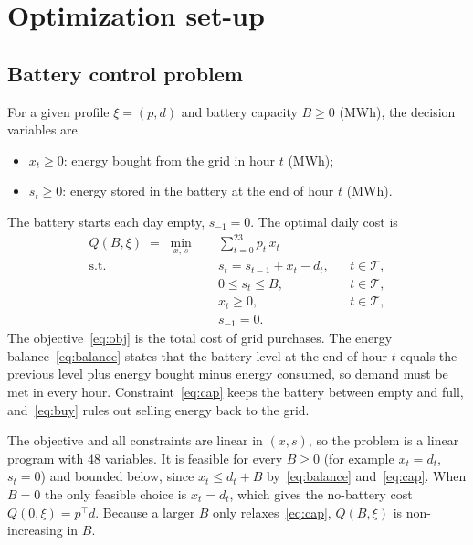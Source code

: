 \documentclass[11pt]{article}
\begin{document}
\section{Optimization set-up}

\subsection{Battery control problem}

For a given profile $\xi = (p, d)$ and battery capacity $B \ge 0$ (MWh), the
decision variables are
\begin{itemize}
  \item $x_t \ge 0$: energy bought from the grid in hour $t$ (MWh);
  \item $s_t \ge 0$: energy stored in the battery at the end of hour $t$ (MWh).
\end{itemize}
The battery starts each day empty, $s_{-1} = 0$. The optimal daily cost is
\begin{align}
  Q(B, \xi) \;=\; \min_{x,\, s} \quad
    & \sum_{t=0}^{23} p_t \, x_t \label{eq:obj} \\
  \text{s.t.} \quad
    & s_t = s_{t-1} + x_t - d_t,  && t \in \mathcal{T}, \label{eq:balance} \\
    & 0 \le s_t \le B,            && t \in \mathcal{T}, \label{eq:cap} \\
    & x_t \ge 0,                  && t \in \mathcal{T}, \label{eq:buy} \\
    & s_{-1} = 0. \nonumber
\end{align}
The objective~\eqref{eq:obj} is the total cost of grid purchases. The energy
balance~\eqref{eq:balance} states that the battery level at the end of hour $t$
equals the previous level plus energy bought minus energy consumed, so demand must
be met in every hour. Constraint~\eqref{eq:cap} keeps the battery between empty
and full, and~\eqref{eq:buy} rules out selling energy back to the grid.

The objective and all constraints are linear in $(x, s)$, so the problem is a
linear program with $48$ variables. It is feasible for every $B \ge 0$ (for
example $x_t = d_t$, $s_t = 0$) and bounded below, since
$x_t \le d_t + B$ by~\eqref{eq:balance} and~\eqref{eq:cap}. When $B = 0$ the only
feasible choice is $x_t = d_t$, which gives the no-battery cost
$Q(0, \xi) = p^\top d$. Because a larger $B$ only relaxes~\eqref{eq:cap},
$Q(B, \xi)$ is non-increasing in $B$.
\end{document}
